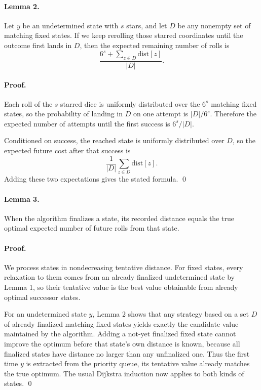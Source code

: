 \documentclass[11pt]{article}
\begin{document}
\paragraph{Lemma 2.}
Let $y$ be an undetermined state with $s$ stars, and let $D$ be any nonempty set of matching fixed states.
If we keep rerolling those starred coordinates until the outcome first lands in $D$, then the expected
remaining number of rolls is
\[
\frac{6^s + \sum_{z \in D}\mathrm{dist}[z]}{|D|}.
\]

\paragraph{Proof.}
Each roll of the $s$ starred dice is uniformly distributed over the $6^s$ matching fixed states, so the
probability of landing in $D$ on one attempt is $|D|/6^s$. Therefore the expected number of attempts
until the first success is $6^s/|D|$.

Conditioned on success, the reached state is uniformly distributed over $D$, so the expected future cost
after that success is
\[
\frac{1}{|D|}\sum_{z \in D}\mathrm{dist}[z].
\]
Adding these two expectations gives the stated formula. \qed

\paragraph{Lemma 3.}
When the algorithm finalizes a state, its recorded distance equals the true optimal expected number of
future rolls from that state.

\paragraph{Proof.}
We process states in nondecreasing tentative distance. For fixed states, every relaxation to them comes
from an already finalized undetermined state by Lemma 1, so their tentative value is the best value
obtainable from already optimal successor states.

For an undetermined state $y$, Lemma 2 shows that any strategy based on a set $D$ of already finalized
matching fixed states yields exactly the candidate value maintained by the algorithm. Adding a not-yet
finalized fixed state cannot improve the optimum before that state's own distance is known, because all
finalized states have distance no larger than any unfinalized one. Thus the first time $y$ is extracted from
the priority queue, its tentative value already matches the true optimum. The usual Dijkstra induction now
applies to both kinds of states. \qed
\end{document}
